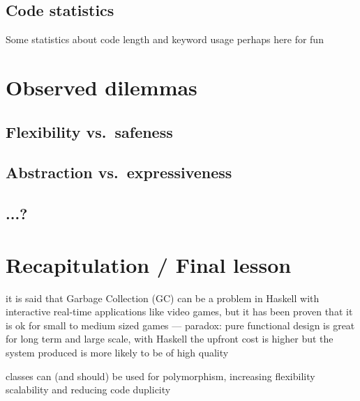 \documentclass[
  digital, %
  color,   %
  table,   %
  oneside, %
  lof,     %
  lot,     %
]{fithesis3}
\newcommand{\vs}{vs.\ }
\begin{document}
{%




\subsection{Code statistics}
Some statistics about code length and keyword usage perhaps here for fun


\section{Observed dilemmas}

\subsection{Flexibility \vs safeness}

\subsection{Abstraction \vs expressiveness}

\subsection{...?}


\section{Recapitulation / Final lesson}

it is said that Garbage Collection (GC) can be a problem in Haskell
with interactive real-time applications like video games, but it has been proven that
it is ok for small to medium sized games
--- paradox: pure functional design is great for long term and large scale,
with Haskell the upfront cost is higher but the system produced is more likely to be of high quality

classes can (and should) be used for polymorphism, increasing flexibility scalability and
reducing code duplicity

}
\end{document}
